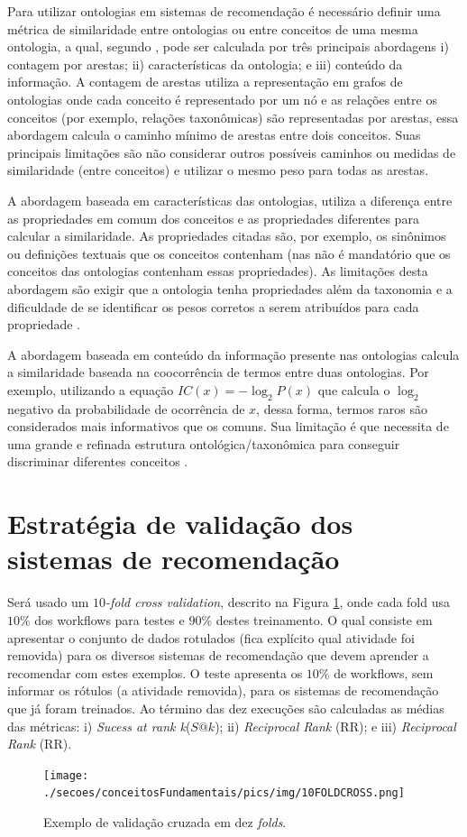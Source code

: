 Para utilizar ontologias em sistemas de recomendação é necessário definir uma métrica de similaridade entre ontologias ou entre conceitos de uma mesma ontologia, a qual, segundo , pode ser calculada por três principais abordagens i) contagem por arestas; ii) características da ontologia; e iii) conteúdo da informação. A contagem de arestas utiliza a representação em grafos de ontologias onde cada conceito é representado por um nó e as relações entre os conceitos (por exemplo, relações taxonômicas) são representadas por arestas, essa abordagem calcula o caminho mínimo de arestas entre dois conceitos. Suas principais limitações são não considerar outros possíveis caminhos ou medidas de similaridade (entre conceitos) e utilizar o mesmo peso para todas as arestas.

A abordagem baseada em características das ontologias, utiliza a diferença entre as propriedades em comum dos conceitos e as propriedades diferentes para calcular a similaridade. As propriedades citadas são, por exemplo, os sinônimos ou definições textuais que os conceitos contenham (nas não é mandatório que os conceitos das ontologias contenham essas propriedades). As limitações desta abordagem são exigir que a ontologia tenha propriedades além da taxonomia e a dificuldade de se identificar os pesos corretos a serem atribuídos para cada propriedade \cite{Sanchez2012}.

A abordagem baseada em conteúdo da informação presente nas ontologias calcula a similaridade baseada na coocorrência de termos entre duas ontologias. Por exemplo, utilizando a equação \(IC(x) = -\log_2 P(x)\) que calcula o \(\log_2\) negativo da probabilidade de ocorrência de \(x\), dessa forma, termos raros são considerados mais informativos que os comuns. Sua limitação é que necessita de uma grande e refinada estrutura ontológica/taxonômica para conseguir discriminar diferentes conceitos .

\section{Estratégia de validação dos sistemas de recomendação} \label{SEC_METRICAS_VALIDACAO}
Será usado um \emph{\(10\)-fold cross validation}, descrito na Figura \ref{figura_10_fold_cross_validation}, onde
cada fold  usa \(10\%\) dos workflows para testes e \(90\%\) destes treinamento. O qual consiste em apresentar o conjunto de dados rotulados (fica explícito qual atividade foi removida) para os diversos sistemas de recomendação que devem aprender a recomendar com estes exemplos. O teste apresenta os \(10\%\) de workflows, sem informar os rótulos (a atividade removida), para os sistemas de recomendação que já foram treinados. Ao término das dez execuções são calculadas as médias das métricas: i) \emph{Sucess at rank k}(\(S@k\)); ii) \emph{Reciprocal Rank} (RR); e iii) \emph{Reciprocal Rank} (RR).
\begin{figure}[!htb]
    \centering   
    \caption{Exemplo de validação cruzada em dez \emph{folds}.}
    \texttt{[image: ./secoes/conceitosFundamentais/pics/img/10FOLDCROSS.png]}
	\label{figura_10_fold_cross_validation}
\end{figure}

